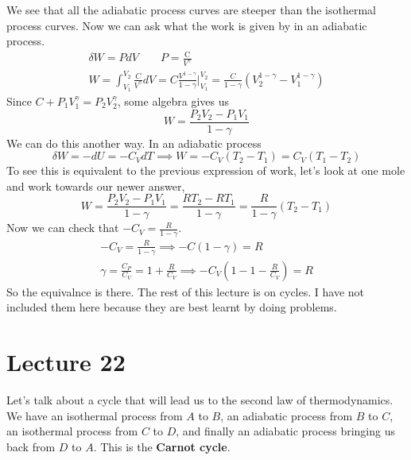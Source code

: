\documentclass{report}
\numberwithin{equation}{section}
\begin{document}
We see that all the adiabatic process curves are steeper than the isothermal process curves. Now we can ask what the work is given by in an adiabatic process. 
\begin{align*}
    \delta W = PdV \qquad P = \frac{\text{C}}{V^{\gamma}}\\
    W = \int^{V_2}_{V_1}\frac{C}{V^{\gamma}}dV = C\frac{V^{1-\gamma}}{1-\gamma}\bigg|^{V_2}_{V_1} = \frac{C}{1-\gamma}\left(V_2^{1-\gamma}-V_1^{1-\gamma}\right)
\end{align*}
Since $C+ P_1V_1^{\gamma} = P_2V_2^{\gamma}$, some algebra gives us 
\begin{equation}
    W = \frac{P_2V_2 - P_1V_1}{1-\gamma}
\end{equation}
We can do this another way. In an adiabatic process 
\begin{equation*}
    \delta W = -dU = -C_VdT \implies W = -C_V(T_2 -T_1) = C_V(T_1-T_2)
\end{equation*}
To see this is equivalent to the previous expression of work, let's look at one mole and work towards our newer answer, 
\begin{equation*}
    W = \frac{P_2V_2 -P_1V_1}{1-\gamma} = \frac{RT_2 - RT_1}{1-\gamma} = \frac{R}{1-\gamma}(T_2-T_1)
\end{equation*}
Now we can check that $-C_V = \frac{R}{1-\gamma}$. 
\begin{align*}
    -C_V = \frac{R}{1-\gamma} \implies -C(1-\gamma) = R\\
    \gamma = \frac{C_P}{C_V} = 1+\frac{R}{C_V} \implies -C_V(1-1-\frac{R}{C_V}) = R 
\end{align*}
So the equivalnce is there. The rest of this lecture is on cycles. I have not included them here because they are best learnt by doing problems.
\section{Lecture 22}
Let's talk about a cycle that will lead us to the second law of thermodynamics. We have an isothermal process from $A$ to $B$, an adiabatic process from $B$ to $C$, an isothermal process from $C$ to $D$, and finally an adiabatic process bringing us back from $D$ to $A$. This is the \textbf{Carnot cycle}.
\end{document}
